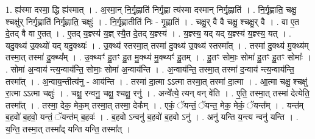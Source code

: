 \documentclass[17pt]{extarticle}
\begin{document}
1. ह्य॑स्मा दस्मा॒ द्धि ह्य॑स्मात् । . अ॒स्मा॒न् नि॒र्गृ॒ह्णाति॑ निर्गृ॒ह्णा त्य॑स्मा दस्मान् निर्गृ॒ह्णाति॑ । . नि॒र्गृ॒ह्णाति॒ चक्षु॒ श्चक्षु॑र् निर्गृ॒ह्णाति॑ निर्गृ॒ह्णाति॒ चक्षुः॑ । . नि॒र्गृ॒ह्णातीति॑ निः - गृ॒ह्णाति॑ । . चक्षु॒र् वै वै चक्षु॒ श्चक्षु॒र् वै । . वा ए॒त दे॒तद् वै वा ए॒तत् । . ए॒तद् य॒ज्ञ्स्य॑ य॒ज्ञ् स्यै॒त दे॒तद् य॒ज्ञ्स्य॑ । . य॒ज्ञ्स्य॒ यद् यद् य॒ज्ञ्स्य॑ य॒ज्ञ्स्य॒ यत् । . यदु॒क्थ्य॑ उ॒क्थ्यो॑ यद् यदु॒क्थ्यः॑ । . उ॒क्थ्य॑ स्तस्मा॒त् तस्मा॑ दु॒क्थ्य॑ उ॒क्थ्य॑ स्तस्मा᳚त् । . तस्मा॑ दु॒क्थ्य॑ मु॒क्थ्य॑म् तस्मा॒त् तस्मा॑ दु॒क्थ्य᳚म् । . उ॒क्थ्यꣳ॑ हु॒तꣳ हु॒त मु॒क्थ्य॑ मु॒क्थ्यꣳ॑ हु॒तम् । . हु॒तꣳ सोमाः॒ सोमा॑ हु॒तꣳ हु॒तꣳ सोमाः᳚ । . सोमा॑ अ॒न्वाय॑ न्त्य॒न्वाय॑न्ति॒ सोमाः॒ सोमा॑ अ॒न्वाय॑न्ति । . अ॒न्वाय॑न्ति॒ तस्मा॒त् तस्मा॑ द॒न्वाय॑ न्त्य॒न्वाय॑न्ति॒ तस्मा᳚त् । . अ॒न्वाय॒न्तीत्य॑नु - आय॑न्ति । . तस्मा॑ दा॒त्मा ऽऽत्मा तस्मा॒त् तस्मा॑ दा॒त्मा । . आ॒त्मा चक्षु॒ श्चक्षु॑ रा॒त्मा ऽऽत्मा चक्षुः॑ । . चक्षु॒ रन्वनु॒ चक्षु॒ श्चक्षु॒ रनु॑ । . अन्वे᳚त्ये॒ त्यन् वन् वे॑ति । . ए॒ति॒ तस्मा॒त् तस्मा॑ देत्येति॒ तस्मा᳚त् । . तस्मा॒ देक॒ मेक॒म् तस्मा॒त् तस्मा॒ देक᳚म् । . एकं॒ ॅयन्तं॒ ॅयन्त॒ मेक॒ मेकं॒ ॅयन्त᳚म् । . यन्त॑म् ब॒हवो॑ ब॒हवो॒ यन्तं॒ ॅयन्त॑म् ब॒हवः॑ । . ब॒हवो ऽन्वनु॑ ब॒हवो॑ ब॒हवो ऽनु॑ । . अनु॑ यन्ति य॒न्त्य न्वनु॑ यन्ति । . य॒न्ति॒ तस्मा॒त् तस्मा᳚द् यन्ति यन्ति॒ तस्मा᳚त् । \newline
\end{document}
